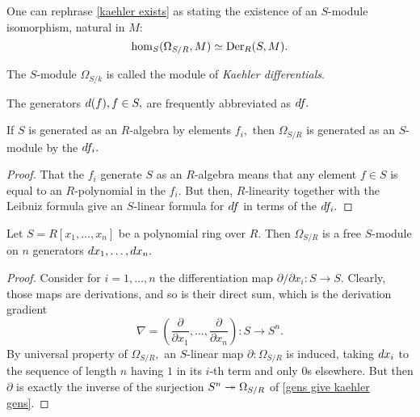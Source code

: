 \begin{note}
  \label{kaehler nat iso}
  One can rephrase \cref{kaehler exists} as stating the existence of an \(S\)-module isomorphism, natural in \(M:\)
  \[ \hom_S(\Omega_{S/{R}}, M) \simeq \operatorname{Der}_R(S, M).\]
\end{note}

\begin{df}
  The \(S\)-module \(\Omega_{S/{k}}\) is called the module of \emph{Kaehler differentials}.
\end{df}

The generators \(d(f), f \in S,\) are frequently abbreviated as \(d f.\)

\begin{prop}
  \label{gens give kaehler gens}
  If \(S\) is generated as an \(R\)-algebra by elements \(f_i,\) then \(\Omega_{S/{R}}\) is generated as an \(S\)-module by the \(d f_i.\)
\end{prop}
\begin{proof}
  That the \(f_i\) generate \(S\) as an \(R\)-algebra means that any element \(f \in S\) is equal to an \(R\)-polynomial in the \(f_i.\) But then, \(R\)-linearity together with the Leibniz formula give an \(S\)-linear formula for \(d f\) in terms of the \(d f_i.\)
\end{proof}

\begin{prop}
  Let \(S = R[x_1, \dotsc, x_n]\) be a polynomial ring over \(R.\) Then \(\Omega_{S/{R}}\) is a free \(S\)-module on \(n\) generators
  \(d x_1, \dotsc, d x_n.\)
\end{prop}
\begin{proof}
  Consider for \(i = 1, \dotsc, n\) the differentiation map
  \(\partial/{\partial x_i} \colon S \to S.\)
  Clearly, those maps are derivations, and so is their direct sum, which is the derivation gradient
  \[\nabla = (\frac{\partial}{\partial x_1}, \dotsc, \frac{\partial}{\partial x_n}) \colon S \to S^n.\]
  By universal property of \(\Omega_{S/{R}},\) an \(S\)-linear map \(\partial \colon \Omega_{S/{R}}\) is induced, taking \(d x_i\) to the sequence of length \(n\) having \(1\) in its \(i\)-th term and only \(0\)s elsewhere.
  But then \(\partial\) is exactly the inverse of the surjection \(S^n \twoheadrightarrow \Omega_{S/{R}}\) of \cref{gens give kaehler gens}.
\end{proof}

